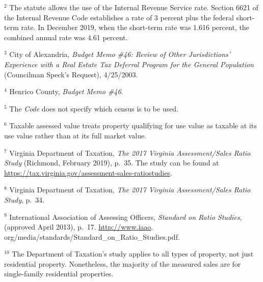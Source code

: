 \documentclass[
]{book}
\begin{document}
\(^2\) The statute allows the use of the Internal Revenue Service rate. Section 6621 of the Internal Revenue Code establishes a rate of 3 percent plus the federal short-term rate. In December 2019, when the short-term rate was 1.616 percent, the combined annual rate was 4.61 percent.

\(^3\) City of Alexandria, \emph{Budget Memo \#46: Review of Other Jurisdictions' Experience with a Real Estate Tax Deferral Program for the General Population} (Councilman Speck's Request), 4/25/2003.

\(^4\) Henrico County, \emph{Budget Memo \#46}.

\(^5\) The \emph{Code} does not specify which census is to be used.

\(^6\) Taxable assessed value treats property qualifying for use value
as taxable at its use value rather than at its full market value.

\(^7\) Virginia Department of Taxation, \emph{The 2017 Virginia Assessment/Sales Ratio Study} (Richmond, February 2019), p.~35. The study
can be found at \url{https://tax.virginia.gov/assessment-sales-ratiostudies}.

\(^8\) Virginia Department of Taxation, \emph{The 2017 Virginia Assessment/Sales Ratio Study}, p.~34.

\(^9\) International Association of Assessing Officers, \emph{Standard on Ratio Studies}, (approved April 2013), p.~17. \url{http://www.iaao}.
org/media/standards/Standard\_on\_Ratio\_Studies.pdf.

\(^10\) The Department of Taxation's study applies to all types of property, not just residential property. Nonetheless, the majority of
the measured sales are for single-family residential properties.

  
\end{document}
